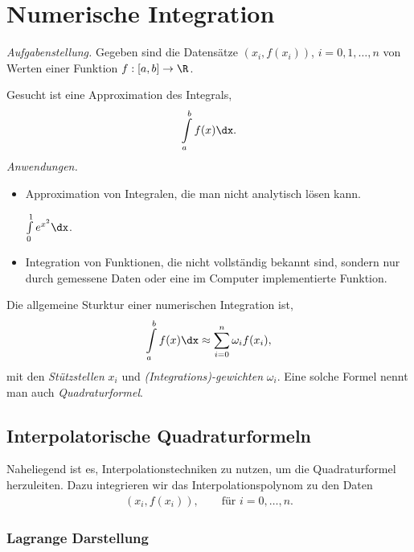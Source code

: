 \section{Numerische Integration}

\textit{Aufgabenstellung.}
Gegeben sind die Datensätze $(x_i,f(x_i))$, $i=0,1,\ldots,n$ von Werten einer
Funktion $f:[a,b]\to\R$.

Gesucht ist eine Approximation des Integrals,
\begin{align*}
\int\limits_a^b f(x)\dx.
\end{align*}
\textit{Anwendungen.}
\begin{itemize}
  \item Approximation von Integralen, die man nicht analytisch lösen kann.
\begin{bspn}
$\int\limits_0^1 e^{x^2}\dx$.\bsphere
\end{bspn}
  \item Integration von Funktionen, die nicht vollständig bekannt sind, sondern
  nur durch gemessene Daten oder eine im Computer implementierte Funktion.
\end{itemize}
Die allgemeine Sturktur einer numerischen Integration ist,
\begin{align*}
\int\limits_a^b f(x)\dx \approx \sum\limits_{i=0}^n \omega_i f(x_i),
\end{align*}
mit den \emph{Stützstellen} $x_i$ und \emph{(Integrations)-gewichten}
$\omega_i$. Eine solche Formel nennt man auch \emph{Quadraturformel}.

\subsection{Interpolatorische Quadraturformeln}

Naheliegend ist es, Interpolationstechniken zu nutzen, um die Quadraturformel
herzuleiten. Dazu integrieren wir das Interpolationspolynom zu den Daten
\begin{align*}
(x_i,f(x_i)),\qquad\text{für }i=0,\ldots,n.
\end{align*}

\subsubsection{Lagrange Darstellung}

